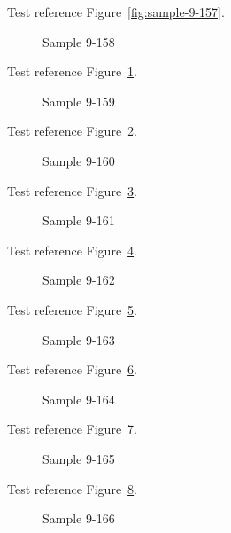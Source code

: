 Test reference Figure~\ref{fig:sample-9-157}.

\begin{figure}[tbhp]
\caption{Sample 9-158}
\label{fig:sample-9-158}
\end{figure}

Test reference Figure~\ref{fig:sample-9-158}.

\begin{figure}[tbhp]
\caption{Sample 9-159}
\label{fig:sample-9-159}
\end{figure}

Test reference Figure~\ref{fig:sample-9-159}.

\begin{figure}[tbhp]
\caption{Sample 9-160}
\label{fig:sample-9-160}
\end{figure}

Test reference Figure~\ref{fig:sample-9-160}.

\begin{figure}[tbhp]
\caption{Sample 9-161}
\label{fig:sample-9-161}
\end{figure}

Test reference Figure~\ref{fig:sample-9-161}.

\begin{figure}[tbhp]
\caption{Sample 9-162}
\label{fig:sample-9-162}
\end{figure}

Test reference Figure~\ref{fig:sample-9-162}.

\begin{figure}[tbhp]
\caption{Sample 9-163}
\label{fig:sample-9-163}
\end{figure}

Test reference Figure~\ref{fig:sample-9-163}.

\begin{figure}[tbhp]
\caption{Sample 9-164}
\label{fig:sample-9-164}
\end{figure}

Test reference Figure~\ref{fig:sample-9-164}.

\begin{figure}[tbhp]
\caption{Sample 9-165}
\label{fig:sample-9-165}
\end{figure}

Test reference Figure~\ref{fig:sample-9-165}.

\begin{figure}[tbhp]
\caption{Sample 9-166}
\label{fig:sample-9-166}
\end{figure}

